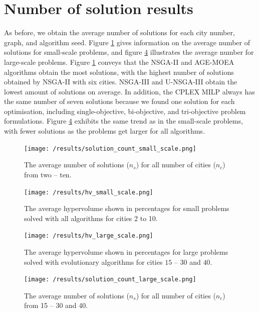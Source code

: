 \documentclass[mscthesis, 11pt]{usiinfthesis}
\theoremstyle{newdefinition}
\begin{document}
\section{Number of solution results}\label{sec:num_sol_res}
As before, we obtain the average number of solutions for each city number, graph, and algorithm seed. Figure \ref{fig:sol_count_small} gives information on the average number of solutions for small-scale problems, and figure \ref{fig:sol_count_large} illustrates the average number for large-scale problems. Figure \ref{fig:sol_count_small} conveys that the NSGA-II and AGE-MOEA algorithms obtain the most solutions, with the highest number of solutions obtained by NSGA-II with six cities. NSGA-III and U-NSGA-III obtain the lowest amount of solutions on average. In addition, the CPLEX MILP always has the same number of seven solutions because we found one solution for each optimisation, including single-objective, bi-objective, and tri-objective problem formulations. Figure \ref{fig:sol_count_large} exhibits the same trend as in the small-scale problems, with fewer solutions as the problems get larger for all algorithms.
\begin{figure}[ht]
    \centering
    \texttt{[image: /results/solution\_count\_small\_scale.png]}
    \caption{The average number of solutions ($n_s$) for all number of cities ($n_c$) from two -- ten.}
    \label{fig:sol_count_small}
\end{figure}
\begin{figure}[ht]
    \centering
    \texttt{[image: /results/hv\_small\_scale.png]}
    \caption{The average hypervolume shown in percentages for small problems solved with all algorithms for cities 2 to 10.}
    \label{fig:hv_small}
\end{figure}
\begin{figure}[ht]
    \centering
    \texttt{[image: /results/hv\_large\_scale.png]}
    \caption{The average hypervolume shown in percentages for large problems solved with evolutionary algorithms for cities $15$ -- $30$ and $40$.}
    \label{fig:hv_large}
\end{figure}
\begin{figure}[ht]
    \centering
    \texttt{[image: /results/solution\_count\_large\_scale.png]}
    \caption{The average number of solutions ($n_s$) for all number of cities ($n_c$) from 15 -- 30 and 40.}
    \label{fig:sol_count_large}
\end{figure}
\clearpage
\end{document}

